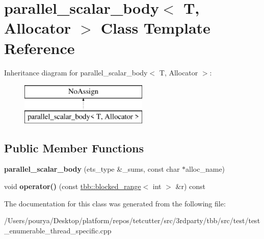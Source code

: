 \hypertarget{classparallel__scalar__body}{}\section{parallel\+\_\+scalar\+\_\+body$<$ T, Allocator $>$ Class Template Reference}
\label{classparallel__scalar__body}
Inheritance diagram for parallel\+\_\+scalar\+\_\+body$<$ T, Allocator $>$\+:\begin{figure}[H]
\begin{center}
\leavevmode
\includegraphics[height=2.000000cm]{classparallel__scalar__body}
\end{center}
\end{figure}
\subsection*{Public Member Functions}
\begin{DoxyCompactItemize}
\item 
\hypertarget{classparallel__scalar__body_aff315b0a1bfb002b7a3656b1ee4aef26}{}{\bfseries parallel\+\_\+scalar\+\_\+body} (ets\+\_\+type \&\+\_\+sums, const char $\ast$alloc\+\_\+name)\label{classparallel__scalar__body_aff315b0a1bfb002b7a3656b1ee4aef26}

\item 
\hypertarget{classparallel__scalar__body_a5b7548104a7ca78e13f2de1cde6de984}{}void {\bfseries operator()} (const \hyperlink{classtbb_1_1blocked__range}{tbb\+::blocked\+\_\+range}$<$ int $>$ \&r) const \label{classparallel__scalar__body_a5b7548104a7ca78e13f2de1cde6de984}

\end{DoxyCompactItemize}


The documentation for this class was generated from the following file\+:\begin{DoxyCompactItemize}
\item 
/\+Users/pourya/\+Desktop/platform/repos/tetcutter/src/3rdparty/tbb/src/test/test\+\_\+enumerable\+\_\+thread\+\_\+specific.\+cpp\end{DoxyCompactItemize}
